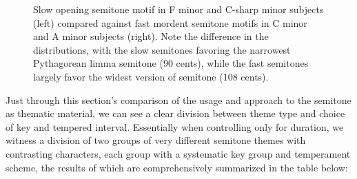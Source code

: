 \begin{figure}[H]
\vspace{1.5em}
    \centering
    \caption[Slow opening semitone motif in F minor and C-sharp minor subjects compared against fast mordent semitone motifs in C minor and A minor subjects. ]{Slow opening semitone motif in F minor and C-sharp minor subjects (left) compared against fast mordent semitone motifs in C minor and A minor subjects (right). Note the difference in the distributions, with the slow semitones favoring the narrowest Pythagorean limma semitone (90 cents), while the fast semitones largely favor the widest version of semitone (108 cents).}
\end{figure}    Just through this section's comparison of the usage and approach to the
semitone as thematic material, we can see a clear division between theme
type and choice of key and tempered interval. Essentially when
controlling only for duration, we witness a division of two groups of
very different semitone themes with contrasting characters, each group
with a systematic key group and temperament scheme, the results of which
are comprehensively summarized in the table below:
